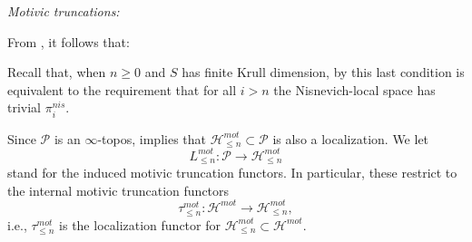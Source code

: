 \textit{Motivic truncations:}

 From , it follows that:
\begin{rem}
     Recall that, when $n\geq 0$ and $S$ has finite Krull dimension, by  this last condition is equivalent to the requirement that for all $i>n$ the Nisnevich-local space has trivial $\pi_i^{nis}$.
 \end{rem}
 Since $\mathcal{P}$ is an $\infty$-topos,  implies that $\mathcal{H}^{mot}_{\leq n}\subset \mathcal{P}$ is also a localization. We let $$L_{\leq n}^{mot}: \mathcal{P}\to \mathcal{H}^{mot}_{\leq n}$$
stand for the induced motivic truncation functors. In particular, these restrict to the internal motivic truncation functors $$\tau_{\leq n}^{mot}: \mathcal{H}^{mot}\to \mathcal{H}^{mot}_{\leq n},$$ i.e., $\tau_{\leq n}^{mot}$ is the localization functor for $\mathcal{H}^{mot}_{\leq n}\subset \mathcal{H}^{mot}$.

